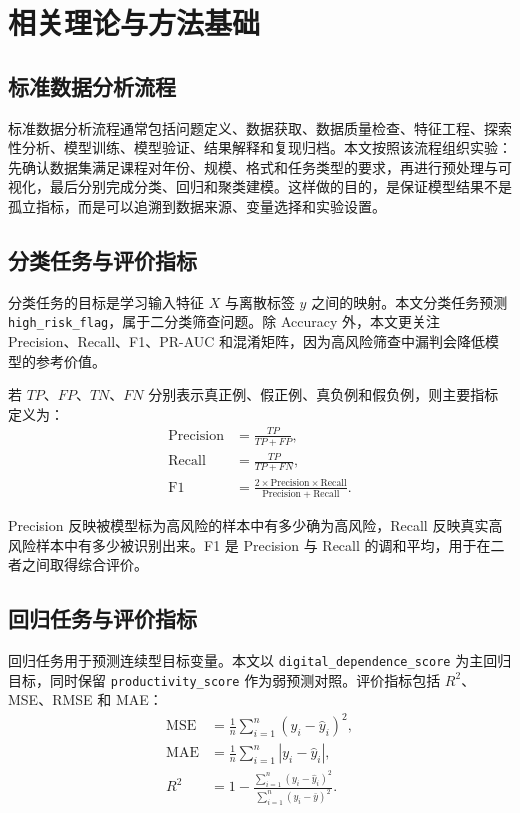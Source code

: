 \chapter{相关理论与方法基础}

\section{标准数据分析流程}

标准数据分析流程通常包括问题定义、数据获取、数据质量检查、特征工程、探索性分析、模型训练、模型验证、结果解释和复现归档。本文按照该流程组织实验：先确认数据集满足课程对年份、规模、格式和任务类型的要求，再进行预处理与可视化，最后分别完成分类、回归和聚类建模。这样做的目的，是保证模型结果不是孤立指标，而是可以追溯到数据来源、变量选择和实验设置。

\section{分类任务与评价指标}

分类任务的目标是学习输入特征 $X$ 与离散标签 $y$ 之间的映射。本文分类任务预测 \texttt{high\_risk\_flag}，属于二分类筛查问题。除 Accuracy 外，本文更关注 Precision、Recall、F1、PR-AUC 和混淆矩阵，因为高风险筛查中漏判会降低模型的参考价值。

若 $TP$、$FP$、$TN$、$FN$ 分别表示真正例、假正例、真负例和假负例，则主要指标定义为：
\begin{align}
\mathrm{Precision} &= \frac{TP}{TP+FP}, \\
\mathrm{Recall} &= \frac{TP}{TP+FN}, \\
\mathrm{F1} &= \frac{2 \times \mathrm{Precision} \times \mathrm{Recall}}{\mathrm{Precision}+\mathrm{Recall}}.
\end{align}

Precision 反映被模型标为高风险的样本中有多少确为高风险，Recall 反映真实高风险样本中有多少被识别出来。F1 是 Precision 与 Recall 的调和平均，用于在二者之间取得综合评价。

\section{回归任务与评价指标}

回归任务用于预测连续型目标变量。本文以 \texttt{digital\_dependence\_score} 为主回归目标，同时保留 \texttt{productivity\_score} 作为弱预测对照。评价指标包括 $R^2$、MSE、RMSE 和 MAE：
\begin{align}
\mathrm{MSE} &= \frac{1}{n}\sum_{i=1}^{n}(y_i-\hat{y}_i)^2, \\
\mathrm{MAE} &= \frac{1}{n}\sum_{i=1}^{n}|y_i-\hat{y}_i|, \\
R^2 &= 1-\frac{\sum_{i=1}^{n}(y_i-\hat{y}_i)^2}{\sum_{i=1}^{n}(y_i-\bar{y})^2}.
\end{align}

